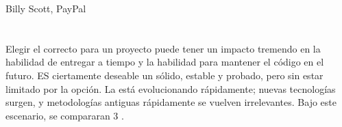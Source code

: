%
%
%
%
%
%
%
%
%
%
%
%
%
%
%
%
%
%
%
%
%
%
%
%
%
Billy Scott, PayPal

\section{\clientSide}

Elegir el \framework correcto para un proyecto puede tener un impacto tremendo en la habilidad de entregar a tiempo y la habilidad para mantener el código en el futuro. ES ciertamente deseable un \framework sólido, estable y probado, pero sin estar limitado por la opción. La \web está evolucionando rápidamente; nuevas tecnologías surgen, y metodologías antiguas rápidamente se vuelven irrelevantes. Bajo este escenario, se compararan 3 \frameworks.


